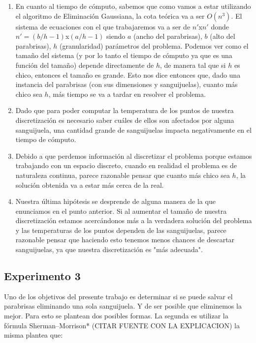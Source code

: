 \begin{enumerate}
\item En cuanto al tiempo de cómputo, sabemos que como vamos a estar utilizando el algoritmo de Eliminación Gaussiana, la cota teórica va a ser $O(n^3)$. El sistema de ecuaciones con el que trabajaremos va a ser de $n'$x$n'$ donde $n' = (b/h - 1)$x$(a/h - 1)$ siendo $a$ (ancho del parabrisas), $b$ (alto del parabrisas), $h$ (granularidad) parámetros del problema. Podemos ver como el tamaño del sistema (y por lo tanto el tiempo de cómputo ya que es una función del tamaño) depende directamente de $h$, de manera tal que si $h$ es chico, entonces el tamaño es grande. Esto nos dice entonces que, dado una instancia del parabrisas (con sus dimensiones y sanguijuelas), cuanto más chico sea $h$, más tiempo se va a tardar en resolver el problema.
\item Dado que para poder computar la temperatura de los puntos de nuestra discretización es necesario saber cuáles de ellos son afectados por alguna sanguijuela, una cantidad grande de sanguijuelas impacta negativamente en el tiempo de cómputo.
\item Debido a que perdemos información al discretizar el problema porque estamos trabajando con un espacio discreto, cuando en realidad el problema es de naturaleza continua, parece razonable pensar que cuanto más chico sea $h$, la solución obtenida va a estar más cerca de la real.
\item Nuestra última hipótesis se desprende de alguna manera de la que enunciamos en el punto anterior. Si al aumentar el tamaño de nuestra discretización estamos acercándonos más a la verdadera solución del problema y las temperaturas de los puntos dependen de las sanguijuelas, parece razonable pensar que haciendo esto tenemos menos chances de descartar sanguijuelas, ya que nuestra discretización es "más adecuada".
\newline
\par 
\end{enumerate}

\subsection{Experimento 3}

Uno de los objetivos del presente trabajo es determinar si se puede salvar el parabrisas eliminando una sola sanguijuela. Y de ser posible que eliminemos la mejor. Para esto se plantean dos posibles formas. La segunda es utilizar la fórmula Sherman–Morrison* (CITAR FUENTE CON LA EXPLICACION) la misma plantea que:

